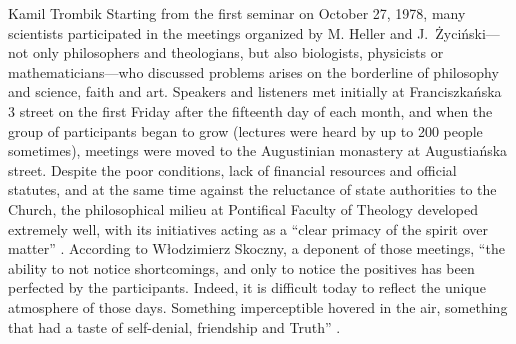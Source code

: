 \begin{artengenv}{Kamil Trombik}
Starting from the first seminar on October 27, 1978, many scientists participated in the meetings organized by M. Heller
and J.~Życiński---not only philosophers and theologians, but also biologists, physicists or mathematicians---who discussed
problems arises on the borderline of philosophy and science, faith and art. Speakers and listeners met initially at
Franciszkańska 3 street on the first Friday after the fifteenth day of each month, and when the group of participants
began to grow (lectures were heard by up to 200 people sometimes), meetings were moved to the Augustinian monastery at
Augustiańska street. Despite the poor conditions, lack of financial resources and official statutes, and at the same
time against the reluctance of state authorities to the Church, the philosophical milieu at Pontifical Faculty of
Theology developed extremely well, with its initiatives acting as a ``clear primacy of the spirit over matter''
\parencite[p.13]{skoczny_spotkania_1999}.
According to Włodzimierz Skoczny, a deponent of those meetings, ``the
ability to not notice shortcomings, and only to notice the positives has been perfected by the participants. Indeed, it
is difficult today to reflect the unique atmosphere of those days. Something imperceptible hovered in the air,
something that had a taste of self-denial, friendship and Truth''
\parencites[p.15]{skoczny_spotkania_1999}[see also][]{zycinski_kartki_1999}.



\end{artengenv}
